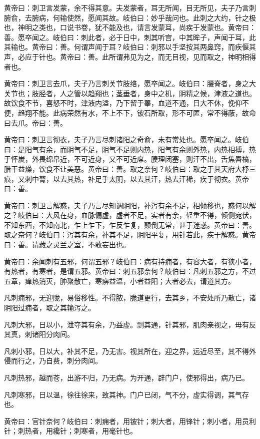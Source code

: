 \documentclass[a4paper,12pt,UTF8,twoside]{ctexbook}
\begin{document}
	黄帝曰：刺卫言发蒙，余不得其意。夫发蒙者，耳无所闻，目无所见，夫子乃言刺腑俞，去腑病，何输使然，愿闻其故。岐伯曰：妙乎哉问也。此刺之大约，针之极也，神明之类也，口说书卷，犹不能及也，请言发蒙耳，尚疾于发蒙也。黄帝曰：善。愿卒闻之。岐伯曰：刺此者，必于日中，刺其听宫，中其眸子，声闻于耳，此其输也。黄帝曰：善。何谓声闻于耳？岐伯曰：刺邪以手坚按其两鼻窍，而疾偃其声，必应于针也。黄帝曰：善。此所谓弗见为之，而无目视，见而取之，神明相得者也。
	
	黄帝曰：刺卫言去爪，夫子乃言刺关节肢络，愿卒闻之。岐伯曰：腰脊者，身之大关节也；肢胫者，人之管以趋翔也；茎垂者，身中之机，阴精之候，津液之道也。故饮食不节，喜怒不时，津液内溢，乃下留于睪，血道不通，日大不休，俛仰不便，趋翔不能。此病荣然有水，不上不下，铍石所取，形不可匿，常不得蔽，故命曰去爪。帝曰：善。
	
	黄帝曰：刺卫言彻衣，夫子乃言尽刺诸阳之奇俞，未有常处也。愿卒闻之。岐伯曰：是阳气有余，而阴气不足，阴气不足则内热，阳气有余则外热，内热相搏，热于怀炭，外畏绵帛近，不可近身，又不可近席。腠理闭塞，则汗不出，舌焦唇槁，腊干益燥，饮食不让美恶。黄帝曰：善。取之奈何？岐伯曰：取之于其天府大杼三痕，又刺中膂，以去其热，补足手太阴，以去其汗，热去汗稀，疾于彻衣。黄帝曰：善。
	
	黄帝曰：刺卫言解惑，夫子乃言尽知调阴阳，补泻有余不足，相倾移也，惑何以解之？岐伯曰：大风在身，血脉偏虚，虚者不足，实者有余，轻重不得，倾侧宛伏，不知东西，不知南北，乍上乍下，乍反乍复，颠倒无常，甚于迷惑。黄帝曰：善。取之奈何？岐伯曰：泻其有余，补其不足，阴阳平复，用针若此，疾于解惑。黄帝曰：善。请藏之灵兰之室，不敢妄出也。
	
	黄帝曰：余闻刺有五邪，何谓五邪？岐伯曰：病有持痈者，有容大者，有狭小者，有热者，有寒者，是谓五邪。黄帝曰：刺五邪奈何？岐伯曰：凡刺五邪之方，不过五章，瘅热消灭，肿聚散亡，寒痹益温，小者益阳；大者必去，请道其方。
	
	凡刺痈邪，无迎陇，易俗移性。不得脓，脆道更行，去其乡，不安处所乃散亡，诸阴阳过痈者，取之其输泻之。
	
	凡刺大邪，日以小，泄夺其有余，乃益虚。剽其通，针其邪，肌肉亲视之，毋有反其真，刺诸阳分肉间。
	
	凡刺小邪，日以大，补其不足，乃无害。视其所在，迎之界，远近尽至，其不得外侵而行之，乃自费，刺分肉间。
	
	凡刺热邪，越而苍，出游不归，乃无病。为开通，辟门户，使邪得出，病乃已。
	
	凡刺寒邪，日以温，徐往徐来，致其神。门户已闭，气不分，虚实得调，其气存也。
	
	黄帝曰：官针奈何？岐伯曰：刺痈者，用铍针；刺大者，用锋针；刺小者，用员利针；刺热者，用纔针；刺寒者，用毫针也。
	
\end{document}
